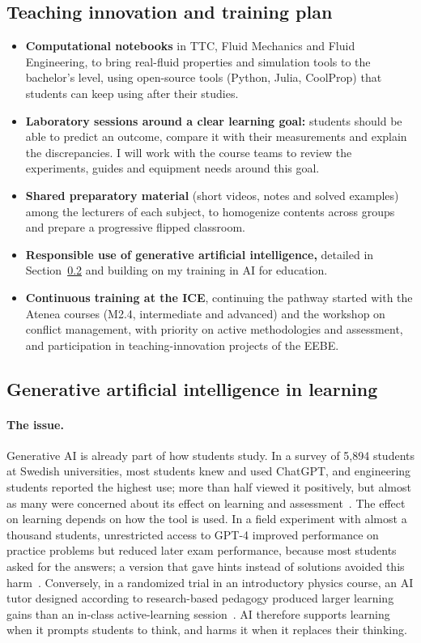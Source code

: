 \documentclass[11pt]{article}
\begin{document}
\subsection{Teaching innovation and training plan}
\begin{itemize}
  \item \textbf{Computational notebooks} in TTC, Fluid Mechanics and Fluid Engineering, to
  bring real-fluid properties and simulation tools to the bachelor's level, using
  open-source tools (Python, Julia, CoolProp) that students can keep using after their
  studies.
  \item \textbf{Laboratory sessions around a clear learning goal:} students should be able
  to predict an outcome, compare it with their measurements and explain the discrepancies.
  I will work with the course teams to review the experiments, guides and equipment needs
  around this goal.
  \item \textbf{Shared preparatory material} (short videos, notes and solved examples)
  among the lecturers of each subject, to homogenize contents across groups and prepare a
  progressive flipped classroom.
  \item \textbf{Responsible use of generative artificial intelligence,} detailed in
  Section~\ref{sec:ai} and building on my training in AI for education.
  \item \textbf{Continuous training at the ICE}, continuing the pathway started with the
  Atenea courses (M2.4, intermediate and advanced) and the workshop on conflict
  management, with priority on active methodologies and assessment, and participation in
  teaching-innovation projects of the EEBE.
\end{itemize}

\subsection{Generative artificial intelligence in learning}\label{sec:ai}
\paragraph{The issue.} Generative AI is already part of how students study. In a survey of
5,894 students at Swedish universities, most students knew and used ChatGPT, and engineering
students reported the highest use; more than half viewed it positively, but almost as many
were concerned about its effect on learning and assessment~\cite{Stohr2024}. The effect on
learning depends on how the tool is used. In a field experiment with almost a thousand
students, unrestricted access to GPT-4 improved performance on practice problems but reduced
later exam performance, because most students asked for the answers; a version that gave
hints instead of solutions avoided this harm~\cite{Bastani2025}. Conversely, in a randomized
trial in an introductory physics course, an AI tutor designed according to research-based
pedagogy produced larger learning gains than an in-class active-learning
session~\cite{Kestin2025}. AI therefore supports learning when it prompts students to think,
and harms it when it replaces their thinking.
\end{document}
